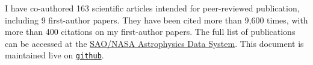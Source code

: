 I have co-authored 163 scientific articles intended for peer-reviewed 
publication, including 9 first-author papers. They have been cited more than 
9,600 times, with more than 400 citations on my 
first-author papers. The full list of publications can be accessed at the 
\href{https://goo.gl/LAu9G4}{SAO/NASA Astrophysics Data System}.
%
This document is maintained live on
\href{https://github.com/cristobal-sifon/cv/blob/master/Sifon_publications.pdf}{\texttt{github}}.

